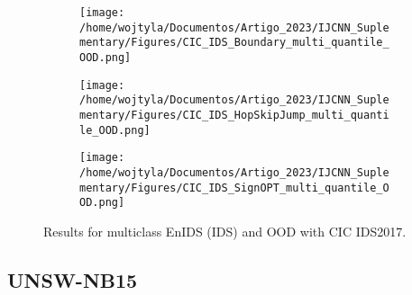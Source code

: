 \documentclass[conference]{IEEEtran}
\begin{document}
\begin{figure}[H]
		\begin{subfigure}[b]{0.45\textwidth} %
			\texttt{[image: /home/wojtyla/Documentos/Artigo\_2023/IJCNN\_Suplementary/Figures/CIC\_IDS\_Boundary\_multi\_quantile\_OOD.png]}
			\label{fig:5}
		\end{subfigure}
		\hfill
		\begin{subfigure}[b]{0.45\textwidth}
			\texttt{[image: /home/wojtyla/Documentos/Artigo\_2023/IJCNN\_Suplementary/Figures/CIC\_IDS\_HopSkipJump\_multi\_quantile\_OOD.png]}
			\label{fig:6}
		\end{subfigure}
		\hfill
		\begin{subfigure}[b]{0.45\textwidth}
			\texttt{[image: /home/wojtyla/Documentos/Artigo\_2023/IJCNN\_Suplementary/Figures/CIC\_IDS\_SignOPT\_multi\_quantile\_OOD.png]}
			\label{fig:7}
		\end{subfigure}
		\caption{Results for multiclass EnIDS (IDS) and OOD with CIC IDS2017.}
		\label{fig:cic_multi_ood}
	\end{figure}
	
	
	\subsection{UNSW-NB15}
	
	
	
\end{document}

